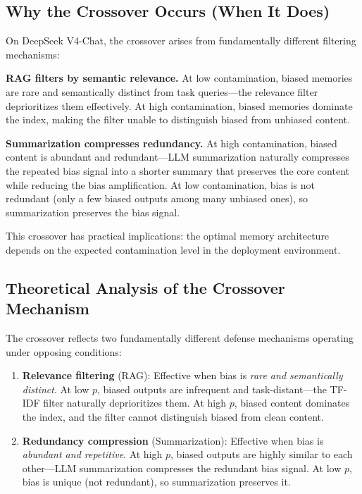 \documentclass[11pt]{article}
\begin{document}
\subsection{Why the Crossover Occurs (When It Does)}

On DeepSeek V4-Chat, the crossover arises from fundamentally different filtering mechanisms:

\textbf{RAG filters by semantic relevance.} At low contamination, biased memories are rare and semantically distinct from task queries---the relevance filter deprioritizes them effectively. At high contamination, biased memories dominate the index, making the filter unable to distinguish biased from unbiased content.

\textbf{Summarization compresses redundancy.} At high contamination, biased content is abundant and redundant---LLM summarization naturally compresses the repeated bias signal into a shorter summary that preserves the core content while reducing the bias amplification. At low contamination, bias is not redundant (only a few biased outputs among many unbiased ones), so summarization preserves the bias signal.

This crossover has practical implications: the optimal memory architecture depends on the expected contamination level in the deployment environment.

\subsection{Theoretical Analysis of the Crossover Mechanism}

The crossover reflects two fundamentally different defense mechanisms operating under opposing conditions:

\begin{enumerate}[nosep]
    \item \textbf{Relevance filtering} (RAG): Effective when bias is \emph{rare and semantically distinct}. At low $p$, biased outputs are infrequent and task-distant---the TF-IDF filter naturally deprioritizes them. At high $p$, biased content dominates the index, and the filter cannot distinguish biased from clean content.
    \item \textbf{Redundancy compression} (Summarization): Effective when bias is \emph{abundant and repetitive}. At high $p$, biased outputs are highly similar to each other---LLM summarization compresses the redundant bias signal. At low $p$, bias is unique (not redundant), so summarization preserves it.
\end{enumerate}
\end{document}
